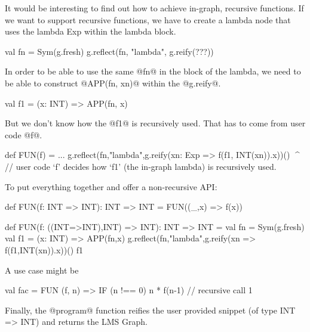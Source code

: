 It would be interesting to find out how to achieve in-graph, recursive functions.
If we want to support recursive functions, we have to create a lambda node that
uses the lambda Exp within the lambda block.
\begin{listing}[scala]
val fn = Sym(g.fresh)
g.reflect(fn, "lambda", g.reify(???))
\end{listing}

In order to be able to use the same @fn@ in the block of the lambda, we need to be
able to construct @APP(fn, xn)@ within the @g.reify@.
\begin{listing}[scala]
val f1 = (x: INT) => APP(fn, x)
\end{listing}

But we don't know how the @f1@ is recursively used. That has to come from user code @f@.
\begin{listing}[scala]
def FUN(f) = {
    ...
    g.reflect(fn,"lambda",g.reify(xn: Exp => f(f1, INT(xn)).x))()
}                                       ^^^^
// user code `f' decides how `f1' (the in-graph lambda) is recursively used.
\end{listing}

To put everything together and offer a non-recursive API:
\begin{listing}[scala]
def FUN(f: INT => INT): INT => INT = FUN((_,x) => f(x))

def FUN(f: ((INT=>INT),INT) => INT): INT => INT = {
    val fn = Sym(g.fresh)
    val f1 = (x: INT) => APP(fn,x)
    g.reflect(fn,"lambda",g.reify(xn => f(f1,INT(xn)).x))()
    f1
}
\end{listing}

A use case might be
\begin{listing}[scala]
val fac = FUN { (f, n) =>
        IF (n !== 0) {
        n * f(n-1) // recursive call
    } {
        1
    }
}
\end{listing}

Finally, the @program@ function reifies the user provided snippet (of type INT => INT)
and returns the LMS Graph.
